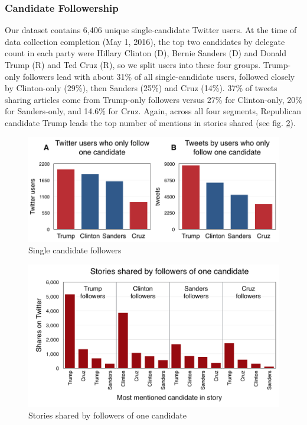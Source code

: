 \documentclass[letterpaper]{article}
\begin{document}
\subsubsection{Candidate Followership}
Our dataset contains 6,406 unique single-candidate Twitter users. At the time of data collection completion (May 1, 2016), the top two candidates by delegate count in each party were Hillary Clinton (D), Bernie Sanders (D) and Donald Trump (R) and Ted Cruz (R), so we split users into these four groups. Trump-only followers lead with about 31\% of all single-candidate users, followed closely by Clinton-only (29\%), then Sanders (25\%) and Cruz (14\%). 37\% of tweets sharing articles come from Trump-only followers versus 27\% for Clinton-only, 20\% for Sanders-only, and 14.6\% for Cruz. Again, across all four segments, Republican candidate Trump leads the top number of mentions in stories shared (see fig. \ref{fig:who-shares-what}).
 
\begin{figure}[t!]  
\centering 
  \includegraphics[width=\columnwidth]{single-candid-charts}  
   \caption{Single candidate followers
     \label{fig:single-candid-charts}}
\end{figure} 

\begin{figure}[t!] 
\centering 
 \includegraphics[width=1.0\columnwidth]{who-shares-what-medium}  
  \caption{Stories shared by followers of one candidate 
    \label{fig:who-shares-what}}
\end{figure}
\end{document}

